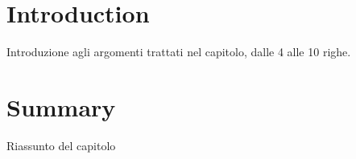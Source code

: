 \section{Introduction}
Introduzione agli argomenti trattati nel capitolo, dalle 4 alle 10 righe.

\section{Summary}
Riassunto del capitolo